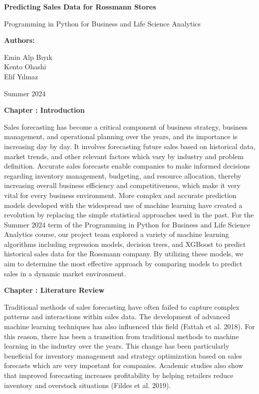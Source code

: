 \documentclass{article}
\newcounter{chapter}
\renewcommand{\thechapter}{\arabic{chapter}}
\newcommand{\mychapter}[1]{
    \stepcounter{chapter}
    \clearpage %
    \noindent
    \begin{center}
        \LARGE\bfseries Chapter \thechapter: #1
    \end{center}
    \vspace{0.25in} %
}
\begin{document}
\begin{titlepage}
    \centering
    \vspace*{1in}
    
    \Huge
    \textbf{Predicting Sales Data for Rossmann Stores}
    
    \vspace{0.5in}
    \LARGE
    Programming in Python for Business and Life Science Analytics
    
    \vspace{1.5in}
    
    \textbf{Authors:}
    
    \vspace{0.5in}
    
    \Large
    Emin Alp Bıyık\\
    Kento Ohashi\\
    Elif Yılmaz
    
    \vfill
    
    \Large
    Summer 2024

\end{titlepage}

\mychapter{Introduction}
Sales forecasting has become a critical component of business strategy, business management, and operational planning over the years, and its importance is increasing day by day. It involves forecasting future sales based on historical data, market trends, and other relevant factors which vary by industry and problem definition. Accurate sales forecasts enable companies to make informed decisions regarding inventory management, budgeting, and resource allocation, thereby increasing overall business efficiency and competitiveness, which make it very vital for every business environment. More complex and accurate prediction models developed with the widespread use of machine learning have created a revolution by replacing the simple statistical approaches used in the past. For the Summer 2024 term of the Programming in Python for Business and Life Science Analytics course, our project team explored a variety of machine learning algorithms including regression models, decision trees, and XGBoost to predict historical sales data for the Rossmann company. By utilizing these models, we aim to determine the most effective approach by comparing models to predict sales in a dynamic market environment.

\mychapter{Literature Review}
Traditional methods of sales forecasting have often failed to capture complex patterns and interactions within sales data. The development of advanced machine learning techniques has also influenced this field (Fattah et al. 2018). For this reason, there has been a transition from traditional methods to machine learning in the industry over the years. This change has been particularly beneficial for inventory management and strategy optimization based on sales forecasts which are very important for companies. Academic studies also show that improved forecasting increases profitability by helping retailers reduce inventory and overstock situations (Fildes et al. 2019).
\end{document}
